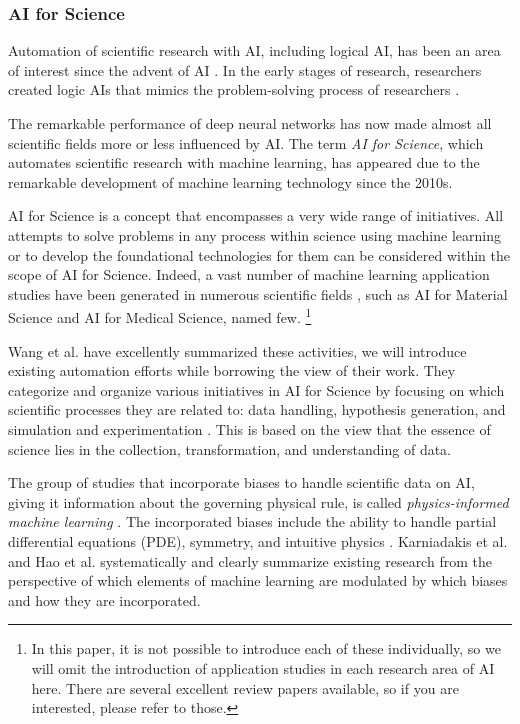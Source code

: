 \subsubsection{AI for Science}

Automation of scientific research with AI, including logical AI, has been an area of interest since the advent of AI \cite{langley1987scientific}. In the early stages of research, researchers created logic AIs that mimics the problem-solving process of researchers \cite{lindsay1993dendral}.

The remarkable performance of deep neural networks has now made almost all scientific fields more or less influenced by AI. The term \textit{AI for Science}, which automates scientific research with machine learning, has appeared due to the remarkable development of machine learning technology since the 2010s. 

AI for Science is a concept that encompasses a very wide range of initiatives. All attempts to solve problems in any process within science using machine learning or to develop the foundational technologies for them can be considered within the scope of AI for Science. Indeed, a vast number of machine learning application studies have been generated in numerous scientific fields \cite{xu2021artificial}, such as AI for Material Science and AI for Medical Science, named few.
\footnote{In this paper, it is not possible to introduce each of these individually, so we will omit the introduction of application studies in each research area of AI here. There are several excellent review papers available, so if you are interested, please refer to those.}

Wang et al. \cite{wang2023scientific} have excellently summarized these activities, we will introduce existing automation efforts while borrowing the view of their work. They categorize and organize various initiatives in AI for Science by focusing on which scientific processes they are related to: data handling, hypothesis generation, and simulation and experimentation \cite{wang2023scientific}. This is based on the view that the essence of science lies in the collection, transformation, and understanding of data.

The group of studies that incorporate biases to handle scientific data on AI, giving it information about the governing physical rule, is called \textit{physics-informed machine learning} \cite{karniadakis2021physics}. The incorporated biases include the ability to handle partial differential equations (PDE), symmetry, and intuitive physics \cite{hao2022physics}. Karniadakis et al. \cite{karniadakis2021physics} and Hao et al. \cite{hao2022physics} systematically and clearly summarize existing research from the perspective of which elements of machine learning are modulated by which biases and how they are incorporated. %

